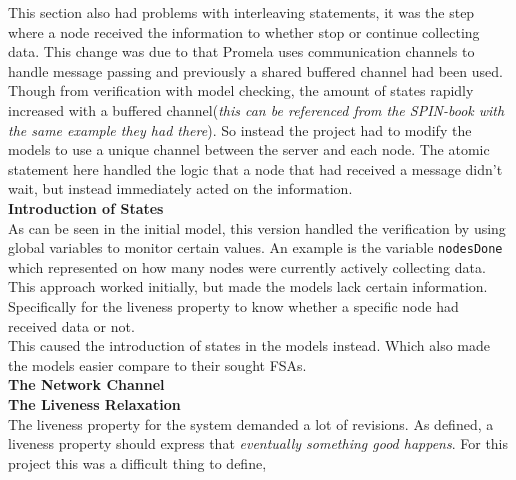 This section also had problems with interleaving statements, it was the step where a node received the information to whether stop or continue collecting data. This change was due to that Promela uses communication channels to handle message passing and previously a shared buffered channel had been used. Though from verification with model checking, the amount of states rapidly increased with a buffered channel(\textit{this can be referenced from the SPIN-book with the same example they had there}). So instead the project had to modify the models to use a unique channel between the server and each node. The atomic statement here handled the logic that a node that had received a message didn't wait, but instead immediately acted on the information. \\

\textbf{Introduction of States} \\


As can be seen in the initial model, this version handled the verification by using global variables to monitor certain values. An example is the variable \texttt{nodesDone} which represented on how many nodes were currently actively collecting data. This approach worked initially, but made the models lack certain information. Specifically for the liveness property to know whether a specific node had received data or not. \\ 

This caused the introduction of states in the models instead. Which also made the models easier compare to their sought FSAs. \\

\textbf{The Network Channel} \\




\textbf{The Liveness Relaxation} \\


The liveness property for the system demanded a lot of revisions. As defined, a liveness property should express that \textit{eventually something good happens}. For this project this was a difficult thing to define, %

